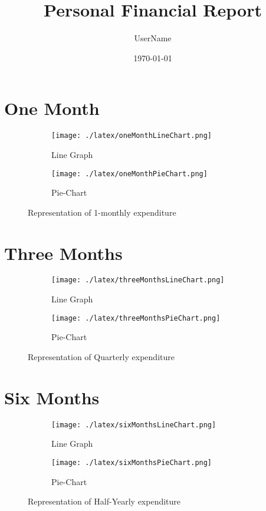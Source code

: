 \documentclass{article}
\begin{document}
\title{Personal Financial Report}
\author{UserName}
\date{\today}
\maketitle

\section{One Month}
\begin{figure}[htbp]
\centering
\begin{subfigure}{0.45\textwidth}
\texttt{[image: ./latex/oneMonthLineChart.png]}
\caption{Line Graph}
\end{subfigure}
\hfill
\begin{subfigure}{0.45\textwidth}
\texttt{[image: ./latex/oneMonthPieChart.png]}
\caption{Pie-Chart}
\end{subfigure}
\caption{Representation of 1-monthly expenditure}
\end{figure}

\section{Three Months}
\begin{figure}[htbp]
\centering
\begin{subfigure}{0.45\textwidth}
\texttt{[image: ./latex/threeMonthsLineChart.png]}
\caption{Line Graph}
\end{subfigure}
\hfill
\begin{subfigure}{0.45\textwidth}
\texttt{[image: ./latex/threeMonthsPieChart.png]}
\caption{Pie-Chart}
\end{subfigure}
\caption{Representation of Quarterly expenditure}
\end{figure}

\section{Six Months}
\begin{figure}[htbp]
\centering
\begin{subfigure}{0.45\textwidth}
\texttt{[image: ./latex/sixMonthsLineChart.png]}
\caption{Line Graph}
\end{subfigure}
\hfill
\begin{subfigure}{0.45\textwidth}
\texttt{[image: ./latex/sixMonthsPieChart.png]}
\caption{Pie-Chart}
\end{subfigure}
\caption{Representation of Half-Yearly expenditure}
\end{figure}
\end{document}
